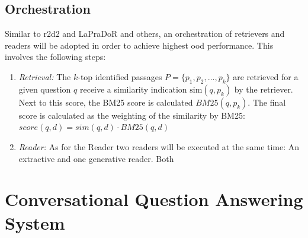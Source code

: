 \subsection{Orchestration}
\label{subsec:qa_orchestration}

Similar to \gls{r2d2}\cite{fajcik_r2-d2_2021} and LaPraDoR \cite{xu_laprador_2022} and others, an orchestration of retrievers and readers will be adopted in order to achieve highest \gls{ood} performance. This involves the following steps:

\begin{enumerate}
    \item \textit{Retrieval:} The $k$-top identified passages $P = \{p_1, p_2, \ldots, p_k\}$ are retrieved for a given question $q$ receive a similarity indication $\text{sim}(q,p_k)$ by the retriever. Next to this score, the BM25 score is calculated $BM25(q,p_k)$. The final score is calculated as the weighting of the similarity by BM25:     $score(q, d) = sim(q, d) \cdot BM25(q, d)$
    \item \textit{Reader:} As for the Reader two readers will be executed at the same time: An extractive and one generative reader. Both 

\end{enumerate}


\section{Conversational Question Answering System}
\label{sec:conv-qa-system}